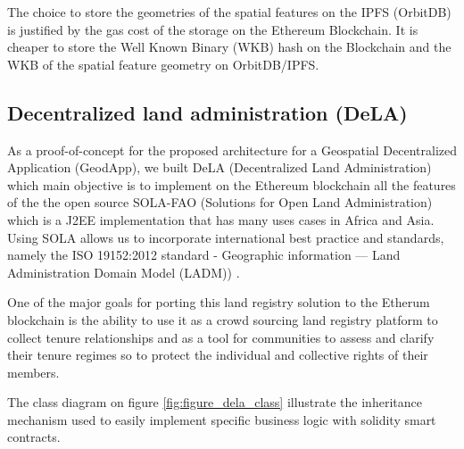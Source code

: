 \documentclass{isprs} %
\begin{document}
The choice to store the geometries of the spatial features on the IPFS (OrbitDB) is justified by the gas cost of the storage on the Ethereum Blockchain. It is cheaper to store the Well Known Binary (WKB) hash on the Blockchain and the WKB of the spatial feature geometry on OrbitDB/IPFS.

\subsection{Decentralized land administration (DeLA)}\label{sec:Decentralized land administration (DeLA)}

As a proof-of-concept for the proposed architecture for a Geospatial Decentralized Application (GeodApp), we built DeLA  (Decentralized Land Administration) which main objective is to implement on the Ethereum blockchain all the features of the the open source SOLA-FAO (Solutions for Open Land Administration) \cite{sola} which is a J2EE implementation that has many uses cases in Africa and Asia. Using SOLA allows us to incorporate international best practice and standards, namely the ISO 19152:2012 standard - Geographic information — Land Administration Domain Model (LADM)) \cite{van2013iso}.

One of the major goals for porting this land registry solution to the Etherum blockchain is the ability to use it as a crowd sourcing land registry platform \cite{seufert2013fao} to collect tenure relationships and as a tool for communities to assess and clarify their tenure regimes so to protect the individual and collective rights of their members. 


The class diagram on figure \ref{fig:figure_dela_class} illustrate the inheritance mechanism used to easily implement specific business logic with solidity smart contracts.
\end{document}
